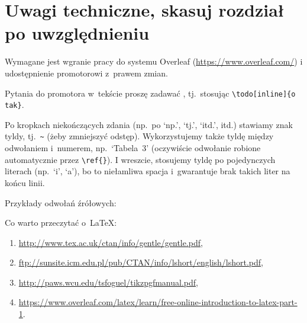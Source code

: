 \documentclass[12pt,a4paper,twoside,openany]{book}
\begin{document}
\clearpage
\thispagestyle{empty}
\mbox{}
\clearpage

\tableofcontents

\clearpage

\chapter*{Uwagi techniczne, skasuj rozdział po uwzględnieniu}

Wymagane jest wgranie pracy do systemu Overleaf (\url{https://www.overleaf.com/}) i udostępnienie promotorowi z~prawem zmian.

Pytania do promotora w~tekście proszę zadawać , tj.~stosując \verb!\todo[inline]{o tak}!.

Po kropkach niekończących zdania (np.~po `np.', `tj.', `itd.', itd.) stawiamy znak tyldy, tj.~\verb!~! (żeby zmniejszyć odstęp). Wykorzystujemy także tyldę między odwołaniem i~numerem, np.~`Tabela~3' (oczywiście odwołanie robione automatycznie przez \verb!\ref{}!). I wreszcie, stosujemy tyldę po pojedynczych literach (np.~`i', `a'), bo to niełamliwa spacja i~gwarantuje brak takich liter na końcu linii.

Przykłady odwołań źrółowych:

Co warto przeczytać o~\LaTeX:
\begin{enumerate}
\footnotesize %
\item \url{http://www.tex.ac.uk/ctan/info/gentle/gentle.pdf},
\item \url{ftp://sunsite.icm.edu.pl/pub/CTAN/info/lshort/english/lshort.pdf},
\item \url{http://paws.wcu.edu/tsfoguel/tikzpgfmanual.pdf},
\item \url{https://www.overleaf.com/latex/learn/free-online-introduction-to-latex-part-1}.
\end{enumerate}
\end{document}
